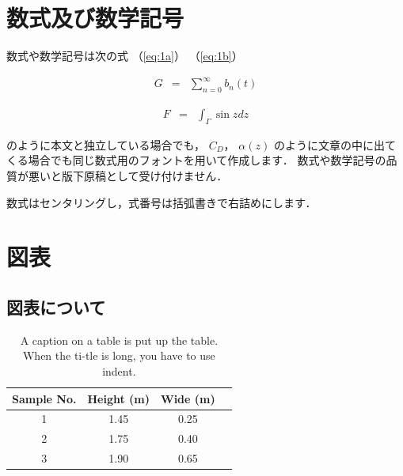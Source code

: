 \section{数式及び数学記号}

数式や数学記号は次の式
（\ref{eq:1a}）
（\ref{eq:1b}）

\begin{eqnarray}
  G &=& \sum_{n = 0}^{\infty}b_{n}\left(t\right)
  \label{eq:1a}
\end{eqnarray}

\begin{eqnarray}
  F &=& \int_{\Gamma}\sin{z} dz
  \label{eq:1b}
\end{eqnarray}

\noindent
のように本文と独立している場合でも，
$C_{D}$，
$\alpha\left(z\right)$
のように文章の中に出てくる場合でも同じ数式用のフォントを用いて作成します．
数式や数学記号の品質が悪いと版下原稿として受け付けません．

数式はセンタリングし，式番号は括弧書きで右詰めにします．

\section{図表}

\subsection{図表について}

\begin{table}[H]
  \centering
  \caption{A caption on a table is put up the table. When the ti-tle is long, you have to use indent.}
  \label{table:example table}
  \begin{tabular}{ |c|c|c|c| }
    \hline
    Sample No. & Height (m) & Wide (m) \\
    \hline
    1          & 1.45       & 0.25     \\
    2          & 1.75       & 0.40     \\
    3          & 1.90       & 0.65     \\
    \hline
  \end{tabular}
\end{table}

